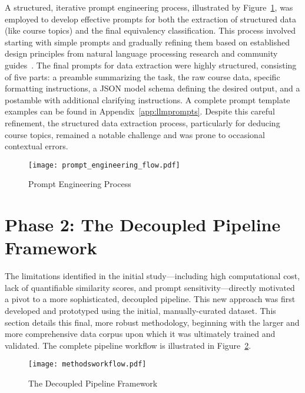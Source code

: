A structured, iterative prompt engineering process, illustrated by Figure~\ref{fig:prompt_engineering_process}, was employed to develop effective prompts for both the extraction of structured data (like course topics) and the final equivalency classification. This process involved starting with simple prompts and gradually refining them based on established design principles from natural language processing research and community guides~\cite{ye2024promptengineeringpromptengineer,ppp,peg}. The final prompts for data extraction were highly structured, consisting of five parts: a preamble summarizing the task, the raw course data, specific formatting instructions, a JSON model schema defining the desired output, and a postamble with additional clarifying instructions. A complete prompt template examples can be found in Appendix~\ref{app:llmprompts}. Despite this careful refinement, the structured data extraction process, particularly for deducing course topics, remained a notable challenge and was prone to occasional contextual errors.

\begin{figure}[tb]
    \captionsetup{skip=5pt}
    \centering
    \texttt{[image: prompt\_engineering\_flow.pdf]}
    \caption{Prompt Engineering Process}
    \label{fig:prompt_engineering_process}
\end{figure}

\section{Phase 2: The Decoupled Pipeline Framework}\label{ch:3.2}
The limitations identified in the initial study—including high computational cost, lack of quantifiable similarity scores, and prompt sensitivity—directly motivated a pivot to a more sophisticated, decoupled pipeline. This new approach was first developed and prototyped using the initial, manually-curated dataset. This section details this final, more robust methodology, beginning with the larger and more comprehensive data corpus upon which it was ultimately trained and validated.  The complete pipeline workflow is illustrated in Figure~\ref{fig:ftpipeline}.

\begin{figure}[tb]
    \captionsetup{skip=5pt}
    \centering
    \texttt{[image: methodsworkflow.pdf]}
    \caption{The Decoupled Pipeline Framework}
    \label{fig:ftpipeline}
\end{figure}

